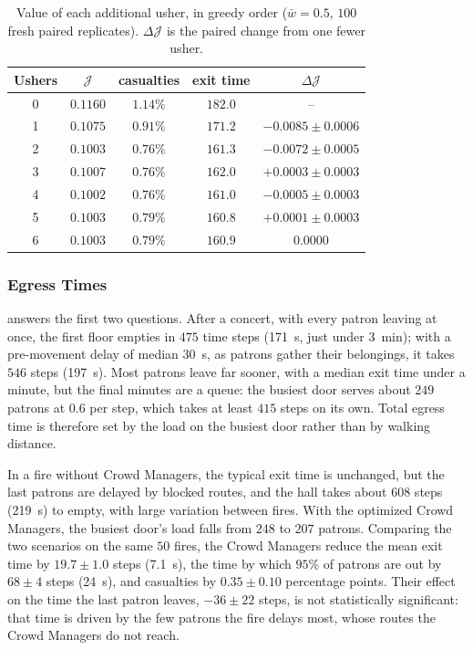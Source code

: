 \documentclass[14pt]{article}
\theoremstyle{definition}
\begin{document}
\begin{table}[H]
  \centering
  \caption{Value of each additional usher, in greedy order ($\bar w = 0.5$, $100$ fresh
  paired replicates). $\Delta\mathcal{J}$ is the paired change from one fewer usher.}
  \label{tab:usher_curve}
  \begin{tabular}{ccccc}
    \toprule
    Ushers & $\mathcal{J}$ & casualties & exit time & $\Delta\mathcal{J}$ \\
    \midrule
    0 & $0.1160$ & $1.14\%$ & $182.0$ & -- \\
    1 & $0.1075$ & $0.91\%$ & $171.2$ & $-0.0085 \pm 0.0006$ \\
    2 & $0.1003$ & $0.76\%$ & $161.3$ & $-0.0072 \pm 0.0005$ \\
    3 & $0.1007$ & $0.76\%$ & $162.0$ & $+0.0003 \pm 0.0003$ \\
    4 & $0.1002$ & $0.76\%$ & $161.0$ & $-0.0005 \pm 0.0003$ \\
    5 & $0.1003$ & $0.79\%$ & $160.8$ & $+0.0001 \pm 0.0003$ \\
    6 & $0.1003$ & $0.79\%$ & $160.9$ & $0.0000$ \\
    \bottomrule
  \end{tabular}
\end{table}

\subsubsection{Egress Times}\label{sec:results_egress}
 answers the first two questions. After a concert, with every patron
leaving at once, the first floor empties in $475$ time steps (\SI{171}{s}, just under
\SI{3}{min}); with a pre-movement delay of median \SI{30}{s}, as patrons gather their
belongings, it takes $546$ steps (\SI{197}{s}). Most patrons leave far sooner, with a
median exit time under a minute, but the final minutes are a queue: the busiest door
serves about $249$ patrons at $0.6$ per step, which takes at least $415$ steps on its own.
Total egress time is therefore set by the load on the busiest door rather than by
walking distance.

In a fire without Crowd Managers, the typical exit time is unchanged, but the last
patrons are delayed by blocked routes, and the hall takes about $608$ steps
(\SI{219}{s}) to empty, with large variation between fires. With the optimized Crowd
Managers, the busiest door's load falls from $248$ to $207$ patrons. Comparing the two
scenarios on the same $50$ fires, the Crowd Managers reduce the mean exit time by
$19.7 \pm 1.0$ steps (\SI{7.1}{s}), the time by which $95\%$ of patrons are out by
$68 \pm 4$ steps (\SI{24}{s}), and casualties by $0.35 \pm 0.10$ percentage points. Their
effect on the time the last patron leaves, $-36 \pm 22$ steps, is not statistically
significant: that time is driven by the few patrons the fire delays most, whose routes
the Crowd Managers do not reach.
\end{document}
